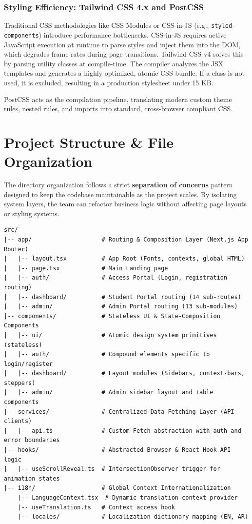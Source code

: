 \documentclass[12pt,a4paper]{article}
\begin{document}
\subsubsection{Styling Efficiency: Tailwind CSS 4.x and PostCSS}

Traditional CSS methodologies like CSS Modules or CSS-in-JS (e.g., \texttt{styled-components}) introduce performance bottlenecks. CSS-in-JS requires active JavaScript execution at runtime to parse styles and inject them into the DOM, which degrades frame rates during page transitions. Tailwind CSS v4 solves this by parsing utility classes at compile-time. The compiler analyzes the JSX templates and generates a highly optimized, atomic CSS bundle. If a class is not used, it is excluded, resulting in a production stylesheet under 15 KB.

PostCSS acts as the compilation pipeline, translating modern custom theme rules, nested rules, and imports into standard, cross-browser compliant CSS.

\section{Project Structure \& File Organization}

The directory organization follows a strict \textbf{separation of concerns} pattern designed to keep the codebase maintainable as the project scales. By isolating system layers, the team can refactor business logic without affecting page layouts or styling systems.

\begin{lstlisting}[language={},title={Project folder structure}]
src/
|-- app/                    # Routing & Composition Layer (Next.js App Router)
|   |-- layout.tsx          # App Root (Fonts, contexts, global HTML)
|   |-- page.tsx            # Main Landing page
|   |-- auth/               # Access Portal (Login, registration routing)
|   |-- dashboard/          # Student Portal routing (14 sub-routes)
|   |-- admin/              # Admin Portal routing (13 sub-modules)
|-- components/             # Stateless UI & State-Composition Components
|   |-- ui/                 # Atomic design system primitives (stateless)
|   |-- auth/               # Compound elements specific to login/register
|   |-- dashboard/          # Layout modules (Sidebars, context-bars, steppers)
|   |-- admin/              # Admin sidebar layout and table components
|-- services/               # Centralized Data Fetching Layer (API clients)
|   |-- api.ts              # Custom Fetch abstraction with auth and error boundaries
|-- hooks/                  # Abstracted Browser & React Hook API logic
|   |-- useScrollReveal.ts  # IntersectionObserver trigger for animation states
|-- i18n/                   # Global Context Internationalization
    |-- LanguageContext.tsx  # Dynamic translation context provider
    |-- useTranslation.ts   # Context access hook
    |-- locales/            # Localization dictionary mapping (EN, AR)
\end{lstlisting}
\end{document}
